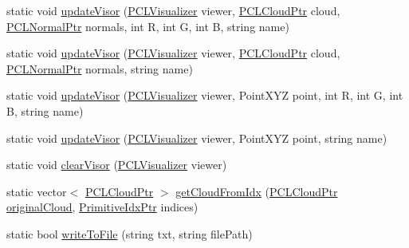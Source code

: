 \begin{DoxyCompactItemize}
static void \hyperlink{classpcm_1_1PCManager_ae65d976eaaf49a2db303e91d30279cb0}{update\-Visor} (\hyperlink{PCManager_8h_a38c805dbc7ad6f06109b85c8e540817a}{P\-C\-L\-Visualizer} viewer, \hyperlink{PCPrimitive_8h_aa14a240c8d999c4f56133c0f70e88783}{P\-C\-L\-Cloud\-Ptr} cloud, \hyperlink{PCPrimitive_8h_a1bc38ce8b0c26e5f2d28fae9f3e3ea97}{P\-C\-L\-Normal\-Ptr} normals, int R, int G, int B, string name)
\item 
static void \hyperlink{classpcm_1_1PCManager_a183ac77330de59a04c4de18e3270fbb8}{update\-Visor} (\hyperlink{PCManager_8h_a38c805dbc7ad6f06109b85c8e540817a}{P\-C\-L\-Visualizer} viewer, \hyperlink{PCPrimitive_8h_aa14a240c8d999c4f56133c0f70e88783}{P\-C\-L\-Cloud\-Ptr} cloud, \hyperlink{PCPrimitive_8h_a1bc38ce8b0c26e5f2d28fae9f3e3ea97}{P\-C\-L\-Normal\-Ptr} normals, string name)
\item 
static void \hyperlink{classpcm_1_1PCManager_a4e249a3ef952e13bf941ccb90ff6c1f9}{update\-Visor} (\hyperlink{PCManager_8h_a38c805dbc7ad6f06109b85c8e540817a}{P\-C\-L\-Visualizer} viewer, Point\-X\-Y\-Z point, int R, int G, int B, string name)
\item 
static void \hyperlink{classpcm_1_1PCManager_a684c37d6b0637aa3bb08fe47d67b9fb6}{update\-Visor} (\hyperlink{PCManager_8h_a38c805dbc7ad6f06109b85c8e540817a}{P\-C\-L\-Visualizer} viewer, Point\-X\-Y\-Z point, string name)
\item 
static void \hyperlink{classpcm_1_1PCManager_a91753945c3d26f6aeee6f0dc6712a7fc}{clear\-Visor} (\hyperlink{PCManager_8h_a38c805dbc7ad6f06109b85c8e540817a}{P\-C\-L\-Visualizer} viewer)
\item 
static vector$<$ \hyperlink{PCPrimitive_8h_aa14a240c8d999c4f56133c0f70e88783}{P\-C\-L\-Cloud\-Ptr} $>$ \hyperlink{classpcm_1_1PCManager_a881ed083a239069699906a669492fc1d}{get\-Cloud\-From\-Idx} (\hyperlink{PCPrimitive_8h_aa14a240c8d999c4f56133c0f70e88783}{P\-C\-L\-Cloud\-Ptr} \hyperlink{classpcm_1_1PCManager_a2f7fc5bdae476711dbd0b79fccca14f3}{original\-Cloud}, \hyperlink{PCPrimitive_8h_a6ec0f6fbb026ae4b66cac121673c3a8a}{Primitive\-Idx\-Ptr} indices)
\item 
static bool \hyperlink{classpcm_1_1PCManager_a2e6128a723d92e75b2525b5f215856b8}{write\-To\-File} (string txt, string file\-Path)
\end{DoxyCompactItemize}
